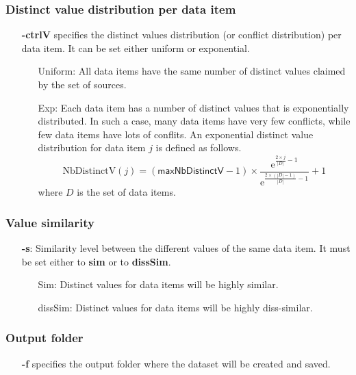 \documentclass[a4paper,10pt]{scrartcl}
\newcommand{\expo}[1]{\ensuremath{\mathrm{e}^{#1}}}
\newcommand{\nbDistinctValue}[1]{\ensuremath{\mathrm{NbDistinctV}(#1)}}
\newcommand{\maxNbDistinctV}{\ensuremath{\mathsf{maxNbDistinctV}}}
\begin{document}
\subsubsection{Distinct value distribution per data item}
\begin{itemize}
 \item[\textbf{-ctrlV}] specifies the distinct values distribution (or conflict distribution) per data item. It can be set either uniform  or exponential.
 \begin{itemize}
  \item [Uniform:] All data items have the same number of distinct values claimed by the set of sources.
  \item [Exp:]  Each data item has a number of distinct values that is exponentially distributed. In such a case, many data 
  items have very few conflicts, while few data items have lots of conflits. An exponential distinct value distribution for 
  data item $j$ is defined as follows.
  \[
   \nbDistinctValue{j} = (\maxNbDistinctV - 1)\times \frac{\expo{\frac{2\times j}{|D|}-1}}{\expo{\frac{2\times(|D|-1)}{|D|} -1}} + 1
  \]
where $D$ is the set of data items.
 \end{itemize}
\end{itemize}
\subsubsection{Value similarity}
\begin{itemize}
  \item[\textbf{-s}:] Similarity level between the different values of the same data item. It must be set either to \textbf{sim} or 
 to \textbf{dissSim}.
  \begin{itemize}
   \item [Sim:] Distinct values for data items will be highly similar.
   \item [dissSim:] Distinct values for data items will be highly diss-similar.
  \end{itemize}
\end{itemize}
\subsubsection{Output folder}
\begin{itemize}
 \item[\textbf{-f}] specifies the output folder where the dataset will be created and saved.
\end{itemize}
\end{document}
